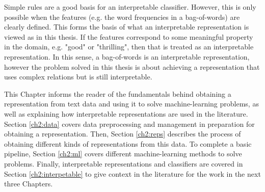 Simple rules are a good basis for an interpretable classifier. However, this is only possible when the features (e.g. the word frequencies in a bag-of-words) are clearly defined. This forms the basis of what an interpretable representation is viewed as in this thesis. If the features correspond to some meaningful property in the domain, e.g. "good" or "thrilling", then that is treated as an interpretable representation. In this sense, a bag-of-words is an interpretable representation, however the problem solved in this thesis is about achieving a representation that uses  complex relations but  is still  interpretable. 

This Chapter informs the reader of the fundamentals behind obtaining a representation from text data and using it to solve machine-learning problems, as well as explaining how interpretable representations are used in the literature. Section \ref{ch2:data} covers data preprocessing and management in preparation for obtaining a representation. Then, Section \ref{ch2:reps} describes the process of obtaining different kinds of representations from this data. To complete a basic pipeline, Section \ref{ch2:ml} covers different machine-learning methods to solve problems. Finally, interpretable representations and classifiers are covered in Section \ref{ch2:interpetable} to give context in the literature for the work in the next three Chapters. 




